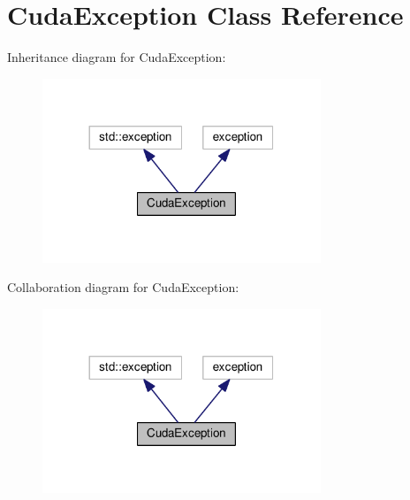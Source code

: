 \hypertarget{class_cuda_exception}{}\section{Cuda\+Exception Class Reference}
\label{class_cuda_exception}


Inheritance diagram for Cuda\+Exception\+:
\nopagebreak
\begin{figure}[H]
\begin{center}
\leavevmode
\includegraphics[width=236pt]{class_cuda_exception__inherit__graph}
\end{center}
\end{figure}


Collaboration diagram for Cuda\+Exception\+:
\nopagebreak
\begin{figure}[H]
\begin{center}
\leavevmode
\includegraphics[width=236pt]{class_cuda_exception__coll__graph}
\end{center}
\end{figure}
